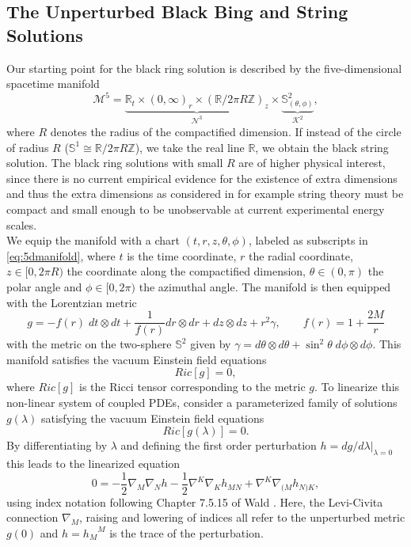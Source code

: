 \documentclass[11pt,aip,jmp,amsmath,amssymb,draft]{revtex4-1}
\begin{document}
\subsection{\label{sec:unperturbed}The Unperturbed Black Bing and String Solutions}
Our starting point for the black ring solution is described by the five-dimensional spacetime manifold
\begin{equation} \label{eq:5dmanifold}
    \mathcal M^5 = \underbrace{\mathbb{R}_t \times (0,\infty)_{r} \times (\mathbb{R}/2\pi R\mathbb{Z})_z}_{\mathcal N^3} \times \underbrace{\mathbb{S}_{(\theta,\phi)}^{2}}_{\mathcal K^2}, 
\end{equation}
where $R$ denotes the radius of the compactified dimension. If instead of the circle of radius $R$ ($\mathbb{S} ^1 \cong \mathbb{R}/2\pi R\mathbb{Z}$), we take the real line $\mathbb{R}$, we obtain the black string solution.
The black ring solutions with small $R$ are of higher physical interest, since there is no current empirical evidence for the existence of extra dimensions and thus the extra dimensions as considered in for example string theory must be compact and small enough to be unobservable at current experimental energy scales.\\
We equip the manifold with a chart $(t,r,z,\theta,\phi)$, labeled as subscripts in \cref{eq:5dmanifold}, where $t$ is the time coordinate, $r$ the radial coordinate, $z\in [0,2\pi R)$ the coordinate along the compactified dimension, $\theta \in (0,\pi)$ the polar angle and $\phi \in [0,2\pi)$ the azimuthal angle.
The manifold is then equipped with the Lorentzian metric
\begin{equation} \label{eq:unperturbed_metric}
    g = -f(r)\; dt\otimes dt + \frac{1}{f(r)} dr\otimes dr + dz\otimes dz + r^2\gamma, \qquad f(r) = 1+ \frac{2M}{r}
\end{equation}
with the metric on the two-sphere $\mathbb{S}^2$ given by $\gamma = d\theta\otimes d\theta + \sin^2\theta\; d\phi\otimes d\phi$.
This manifold satisfies the vacuum Einstein field equations
\begin{equation}
    Ric[g] = 0,
\end{equation}
where $Ric[g]$ is the Ricci tensor corresponding to the metric $g$.
To linearize this non-linear system of coupled PDEs, consider a parameterized family of solutions $g(\lambda)$ satisfying the vacuum Einstein field equations
\begin{equation}
    Ric[g(\lambda)] = 0.
\end{equation}
By differentiating by $\lambda$ and defining the first order perturbation $h = dg/d\lambda|_{\lambda =0}$ this leads to the linearized equation 
\begin{equation}\label{eq:linearized_ESFE}
    0 = -\frac{1}{2}\nabla_M\nabla_N h - \frac{1}{2}\nabla^K \nabla_K h_{MN}  + \nabla^K\nabla_{(M}h_{N)K},
\end{equation}
using index notation following Chapter 7.5.15 of Wald \cite{wald2010general}.
Here, the Levi-Civita connection $\nabla_M$, raising and lowering of indices all refer to the unperturbed metric $g(0)$ and $h = {h_M}^M$ is the trace of the perturbation. 
\end{document}
